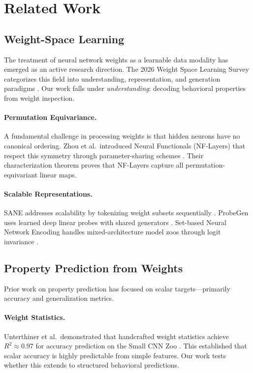 \section{Related Work}

\subsection{Weight-Space Learning}

The treatment of neural network weights as a learnable data modality has emerged as an active research direction. The 2026 Weight Space Learning Survey categorizes this field into understanding, representation, and generation paradigms \cite{han2026survey}. Our work falls under \emph{understanding}: decoding behavioral properties from weight inspection.

\paragraph{Permutation Equivariance.} A fundamental challenge in processing weights is that hidden neurons have no canonical ordering. Zhou et al.\ introduced Neural Functionals (NF-Layers) that respect this symmetry through parameter-sharing schemes \cite{zhou2023nf}. Their characterization theorem proves that NF-Layers capture all permutation-equivariant linear maps.

\paragraph{Scalable Representations.} SANE addresses scalability by tokenizing weight subsets sequentially \cite{schurholt2024sane}. ProbeGen uses learned deep linear probes with shared generators \cite{kahana2024probegen}. Set-based Neural Network Encoding handles mixed-architecture model zoos through logit invariance \cite{andreis2023setbased}.

\subsection{Property Prediction from Weights}

Prior work on property prediction has focused on scalar targets---primarily accuracy and generalization metrics.

\paragraph{Weight Statistics.} Unterthiner et al.\ demonstrated that handcrafted weight statistics achieve $R^2 \approx 0.97$ for accuracy prediction on the Small CNN Zoo \cite{unterthiner2020predicting}. This established that scalar accuracy is highly predictable from simple features. Our work tests whether this extends to structured behavioral predictions.

